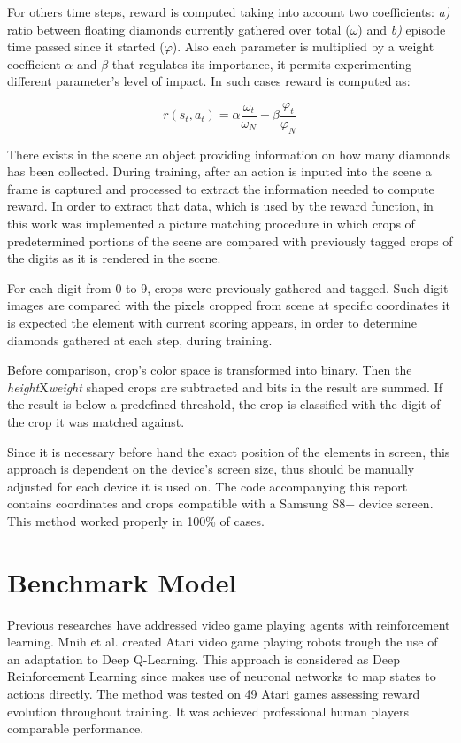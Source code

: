 \documentclass[peerreview,onecolumn]{IEEEtran}
\begin{document}
	For others time steps, reward is computed taking into account two coefficients: \textit{a)} ratio between floating diamonds currently gathered over total ($\omega$) and \textit{b)} episode time passed since it started ($\varphi$). Also each parameter is multiplied by a weight coefficient $\alpha$ and $\beta$ that regulates its importance, it permits experimenting different parameter's level of impact. In such cases reward is computed as:
	
	\begin{equation}
	  r(s_t, a_t) = \alpha \frac{\omega_t}{\omega_N} - \beta \frac{\varphi_t}{\varphi_N} 
	\end{equation}
	
	
	There exists in the scene an object providing information on how many diamonds has been collected. During training, after an action is inputed into the scene a frame is captured and processed to extract the information needed to compute reward. In order to extract that data, which is used by the reward function, in this work was implemented a picture matching procedure in which crops of predetermined portions of the scene are compared with previously tagged crops of the digits as it is rendered in the scene. 

	For each digit from 0 to 9, crops were previously gathered and tagged. Such digit images are compared with the pixels cropped from scene at specific coordinates it is expected the element with current scoring appears, in order to determine diamonds gathered at each step, during training. 
	
	Before comparison, crop's color space is transformed into binary. Then the \textit{height}X\textit{weight} shaped crops are subtracted and bits in the result are summed. If the result is below a predefined threshold, the crop is classified with the digit of the crop it was matched against.
	  
	Since it is necessary before hand the exact position of the elements in screen, this approach is dependent on the device's screen size, thus should be manually adjusted for each device it is used on. The code accompanying this report contains coordinates and crops compatible with a Samsung S8+ device screen. This method worked properly in 100\% of cases.
	
	  \section{Benchmark Model}
	  
	  Previous researches have addressed video game playing agents with reinforcement learning. Mnih et al.  \cite{replay_buffer_2015} created Atari video game playing robots trough the use of an adaptation to Deep Q-Learning. This approach is considered as Deep Reinforcement Learning since makes use of neuronal networks to map states to actions directly. The method was tested on 49 Atari games assessing reward evolution throughout training. It was achieved professional human players comparable performance. 
	  
\end{document}
